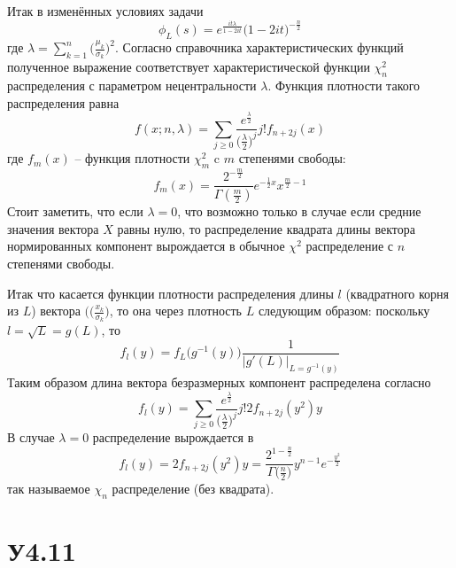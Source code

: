\documentclass[a4paper]{article}
\begin{document}
Итак в изменённых условиях задачи 
\[\phi_L(s) = e^\frac{it \lambda}{1 - 2it} \bigl(1 - 2it\bigr)^{-\frac{n}{2}}\]
где $\lambda = \sum_{k=1}^n \bigl(\frac{\mu_k}{\sigma_k}\bigr)^2$. Согласно справочника
характеристических функций полученное выражение соответствует характеристической
функции $\chi^2_n$ распределения с параметром нецентральности $\lambda$. Функция
плотности такого распределения равна
\[
f(x;n,\lambda)
= \sum_{j\geq 0} \frac{e^\frac{\lambda}{2}}{ \bigl(\frac{\lambda}{2}\bigr)^j}{j!} f_{n+2j}(x)
\]
где $f_m(x)$ -- функция плотности $\chi^2_m$ c $m$ степенями свободы:
\[f_m(x) = \frac{2^{-\frac{m}{2}}}{\Gamma(\frac{m}{2})} e^{-\frac{1}{2}x} x^{\frac{m}{2}-1}\]
Стоит заметить, что если $\lambda = 0$, что возможно только в случае если средние
значения вектора $X$ равны нулю, то распределение квадрата длины вектора
нормированных компонент вырождается в обычное $\chi^2$ распределение с $n$ степенями
свободы.

Итак что касается функции плотности распределения длины $l$ (квадратного корня из $L$)
вектора $(\bigl(\frac{x_k}{\sigma_k}\bigr)$, то она через плотность $L$ следующим
образом: поскольку $l = \sqrt{L} = g(L)$, то
\[f_l(y) = f_L\bigl(g^{-1}(y)\bigr) \frac{1}{\bigl\lvert g'(L)\bigr\rvert_{L=g^{-1}(y)}}\]
Таким образом длина вектора безразмерных компонент распределена согласно
\[f_l(y) = \sum_{j\geq 0} \frac{e^\frac{\lambda}{2}}{ \bigl(\frac{\lambda}{2}\bigr)^j}{j!} 2 f_{n+2j}(y^2) y\]
В случае $\lambda = 0$ распределение вырождается в 
\[
f_l(y)
= 2 f_{n+2j}(y^2) y
= \frac{2^{1-\frac{n}{2}}}{\Gamma\bigl(\frac{n}{2}\bigr)} y^{n-1} e^{-\frac{y^2}{2}}
\]
так называемое $\chi_n$ распределение (без квадрата).


\section{У4.11} %
\label{sec:problem_4_11}
\end{document}
